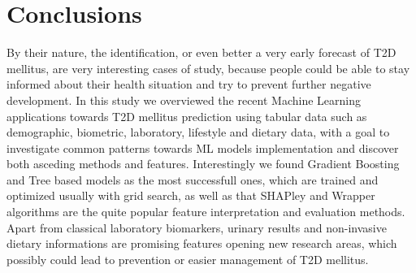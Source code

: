 \documentclass[journal,article,submit,pdftex,moreauthors]{Definitions/mdpi}
\begin{document}
\section{Conclusions}
By their nature, the identification, or even better a very early forecast of T2D mellitus, are very interesting cases of study, 
because people could be able to stay informed about their health situation and try to prevent further negative development.
In this study we overviewed the recent Machine Learning applications towards T2D mellitus prediction using tabular data such as 
demographic, biometric, laboratory, lifestyle and dietary data, with a goal to investigate common patterns towards ML models 
implementation and discover both asceding methods and features. Interestingly we found Gradient Boosting and Tree based
models as the most successfull ones, which are trained and optimized usually with grid search, as well as that SHAPley and Wrapper
algorithms are the quite popular feature interpretation and evaluation methods. Apart from classical laboratory biomarkers,
urinary results and non-invasive dietary informations are promising features opening new research areas, which possibly could lead 
to prevention or easier management of T2D mellitus. 





\vspace{6pt} 


\end{document}
